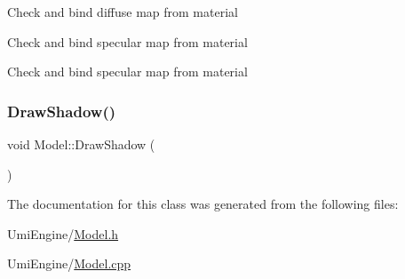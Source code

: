 Check and bind diffuse map from material

Check and bind specular map from material

Check and bind specular map from material \mbox{\label{class_model_ac2e396a05a6b7af011c213dcbd2dae21}} 
\subsubsection{\texorpdfstring{DrawShadow()}{DrawShadow()}}
{\footnotesize\ttfamily void Model\+::\+Draw\+Shadow (\begin{DoxyParamCaption}{ }\end{DoxyParamCaption})}



The documentation for this class was generated from the following files\+:\begin{DoxyCompactItemize}
\item 
Umi\+Engine/\mbox{\hyperlink{_model_8h}{Model.\+h}}\item 
Umi\+Engine/\mbox{\hyperlink{_model_8cpp}{Model.\+cpp}}\end{DoxyCompactItemize}
